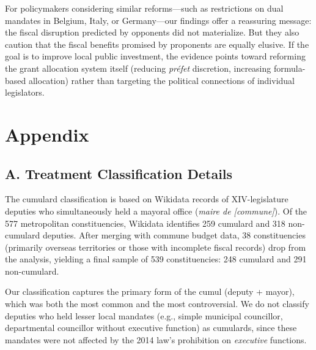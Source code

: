 \documentclass[12pt]{article}
\begin{document}
For policymakers considering similar reforms---such as restrictions on dual mandates in Belgium, Italy, or Germany---our findings offer a reassuring message: the fiscal disruption predicted by opponents did not materialize. But they also caution that the fiscal benefits promised by proponents are equally elusive. If the goal is to improve local public investment, the evidence points toward reforming the grant allocation system itself (reducing \textit{préfet} discretion, increasing formula-based allocation) rather than targeting the political connections of individual legislators.

\label{apep_main_text_end}




\clearpage
\appendix
\setcounter{table}{0}
\renewcommand{\thetable}{A\arabic{table}}
\setcounter{figure}{0}
\renewcommand{\thefigure}{A\arabic{figure}}

\section*{Appendix}

\subsection*{A. Treatment Classification Details}



The cumulard classification is based on Wikidata records of XIV-legislature deputies who simultaneously held a mayoral office (\textit{maire de [commune]}). Of the 577 metropolitan constituencies, Wikidata identifies 259 cumulard and 318 non-cumulard deputies. After merging with commune budget data, 38 constituencies (primarily overseas territories or those with incomplete fiscal records) drop from the analysis, yielding a final sample of 539 constituencies: 248 cumulard and 291 non-cumulard.

Our classification captures the primary form of the cumul (deputy + mayor), which was both the most common and the most controversial. We do not classify deputies who held lesser local mandates (e.g., simple municipal councillor, departmental councillor without executive function) as cumulards, since these mandates were not affected by the 2014 law's prohibition on \textit{executive} functions.
\end{document}
